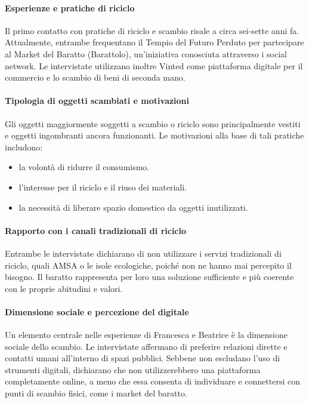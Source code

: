 \documentclass[12pt,a4paper]{article}
\begin{document}
\paragraph{Esperienze e pratiche di riciclo}


Il primo contatto con pratiche di riciclo e scambio risale a circa sei-sette anni fa. Attualmente, entrambe frequentano il Tempio del Futuro Perduto per partecipare al Market del Baratto (Barattolo), un’iniziativa conosciuta attraverso i social network.
Le intervistate utilizzano inoltre Vinted come piattaforma digitale per il commercio e lo scambio di beni di seconda mano.

\paragraph{Tipologia di oggetti scambiati e motivazioni}

Gli oggetti maggiormente soggetti a scambio o riciclo sono principalmente vestiti e oggetti ingombranti ancora funzionanti. Le motivazioni alla base di tali pratiche includono:

\begin{itemize}
  \item la volontà di ridurre il consumismo.
  \item l’interesse per il riciclo e il riuso dei materiali.
  \item la necessità di liberare spazio domestico da oggetti inutilizzati.
\end{itemize}

\paragraph{Rapporto con i canali tradizionali di riciclo}

Entrambe le intervistate dichiarano di non utilizzare i servizi tradizionali di riciclo, quali AMSA o le isole ecologiche, poiché non ne hanno mai percepito il bisogno. Il baratto rappresenta per loro una soluzione sufficiente e più coerente con le proprie abitudini e valori.

\paragraph{Dimensione sociale e percezione del digitale}

Un elemento centrale nelle esperienze di Francesca e Beatrice è la dimensione sociale dello scambio. Le intervistate affermano di preferire relazioni dirette e contatti umani all’interno di spazi pubblici.
Sebbene non escludano l’uso di strumenti digitali, dichiarano che non utilizzerebbero una piattaforma completamente online, a meno che essa consenta di individuare e connettersi con punti di scambio fisici, come i market del baratto.
\end{document}
